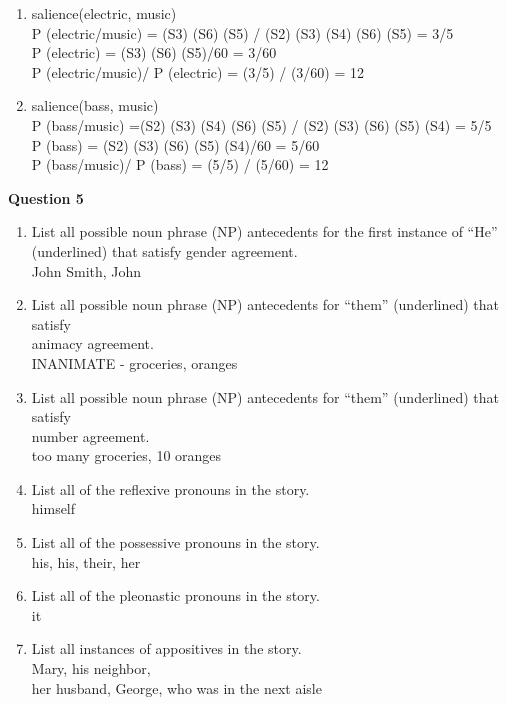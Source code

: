 \documentclass[11pt]{article}
\begin{document}
\begin{enumerate}
\begin{enumerate}
 \item salience(electric, {\sc music}) \\
P (electric/music) = (S3) (S6) (S5) / (S2) (S3) (S4) (S6) (S5) = 3/5\\
P (electric) = (S3) (S6) (S5)/60 = 3/60\\
P (electric/music)/ P (electric) = (3/5) / (3/60) = 12\\


 \item salience(bass, {\sc music}) \\
P (bass/music) =(S2) (S3) (S4) (S6) (S5) / (S2) (S3) (S6) (S5) (S4) = 5/5 \\
P (bass) = (S2) (S3) (S6) (S5) (S4)/60 = 5/60\\
P (bass/music)/ P (bass) = (5/5) / (5/60) = 12\\

\end{enumerate}


\newpage
{\bf Question 5}
\begin{enumerate}
\item List all possible  noun phrase (NP) antecedents for the first instance
  of ``He'' (underlined)  that satisfy gender  agreement.  \\ 
John Smith, John

\item List all possible  noun phrase (NP) antecedents for ``them'' (underlined) that
  satisfy \\ animacy  agreement.   \\ 
INANIMATE - groceries, oranges

\item List all possible  noun phrase (NP) antecedents for ``them'' (underlined) that satisfy \\ number   agreement.  \\ 
too many groceries, 10 oranges

\item List all of the reflexive pronouns in the story.  \\ 
himself

\item List all of the possessive pronouns in the story. \\
his, his, their, her

\item List all of the pleonastic pronouns in the story.  \\ 
it

\item List all instances of appositives in the story. \\
Mary, his neighbor, \\her husband, George, who was in the next aisle
 
\end{enumerate}

\end{enumerate}  
\end{document}
